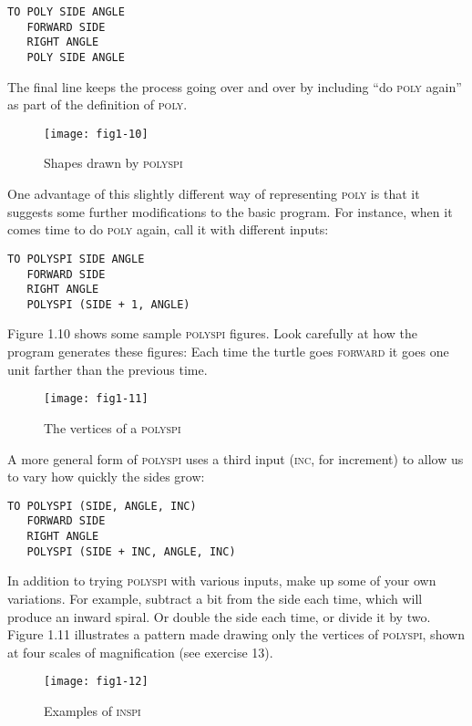\documentclass{book}
\begin{document}
\begin{verbatim}
TO POLY SIDE ANGLE
   FORWARD SIDE
   RIGHT ANGLE
   POLY SIDE ANGLE
\end{verbatim}
The final line keeps the process going over and over by including ``do \textsc{poly} again'' as part of the definition of \textsc{poly}.

\begin{figure}
\begin{center}
\texttt{[image: fig1-10]}
\caption{Shapes drawn by \textsc{polyspi}}
\end{center}
\end{figure}

One advantage of this slightly different way of representing \textsc{poly} is
that it suggests some further modifications to the basic program. For
instance, when it comes time to do \textsc{poly} again, call it with different
inputs: 

\begin{verbatim}
TO POLYSPI SIDE ANGLE
   FORWARD SIDE
   RIGHT ANGLE
   POLYSPI (SIDE + 1, ANGLE)
\end{verbatim}
Figure 1.10 shows some sample \textsc{polyspi} figures. Look carefully at how
the program generates these figures: Each time the turtle goes \textsc{forward}
it goes one unit farther than the previous time.

\begin{figure}
\begin{center}
\texttt{[image: fig1-11]}
\caption{The vertices of a \textsc{polyspi}}
\end{center}
\end{figure}

A more general form of \textsc{polyspi} uses a third input (\textsc{inc}, for increment)
to allow us to vary how quickly the sides grow:

\begin{verbatim}
TO POLYSPI (SIDE, ANGLE, INC)
   FORWARD SIDE
   RIGHT ANGLE
   POLYSPI (SIDE + INC, ANGLE, INC)
\end{verbatim}
In addition to trying \textsc{polyspi} with various inputs, make up some of your
own variations. For example, subtract a bit from the side each time,
which will produce an inward spiral. Or double the side each time, or
divide it by two. Figure 1.11 illustrates a pattern made drawing only the
vertices of \textsc{polyspi}, shown at four scales of magnification (see 
exercise 13).  

\begin{figure}
\begin{center}
\texttt{[image: fig1-12]}
\caption{Examples of \textsc{inspi}}
\end{center}
\end{figure}
\end{document}
